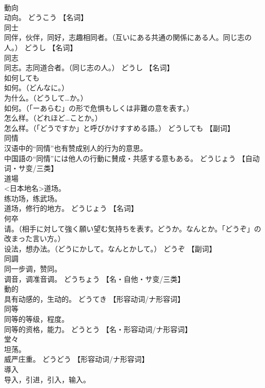 \documentclass[8pt]{extreport}
\begin{document}
\begin{CJK}{UTF8}{min}
\\	動向	
\\	动向。	どうこう		【名词】
\\	同士	
\\	同伴，伙伴，同好，志趣相同者。（互いにある共通の関係にある人。同じ志の人。）	どうし		【名词】
\\	同志	
\\	同志。志同道合者。（同じ志の人。）	どうし		【名词】
\\	如何しても	
\\	如何。（どんなに。） 
\\	为什么。（どうして…か。） 
\\	如何。（「ーあらむ」の形で危惧もしくは非難の意を表す。） 
\\	怎么样。（どれほど…ことか。） 
\\	怎么样。（「どうですか」と呼びかけすすめる語。）	どうしても		【副词】
\\	同情	
\\	汉语中的“同情”也有赞成别人的行为的意思。 
\\	中国語の“同情”には他人の行動に賛成・共感する意もある。	どうじょう		【自动词・サ变/三类】
\\	道場	
\\	<日本地名>道场。 
\\	练功场，练武场。 
\\	道场，修行的地方。	どうじょう		【名词】
\\	何卒	
\\	请。（相手に対して強く願い望む気持ちを表す。どうか。なんとか。「どうぞ」の改まった言い方。） 
\\	设法，想办法。（どうにかして。なんとかして。）	どうぞ		【副词】
\\	同調	
\\	同一步调，赞同。 
\\	调音，调准音调。	どうちょう		【名・自他・サ变/三类】
\\	動的	
\\	具有动感的，生动的。	どうてき		【形容动词/ナ形容词】
\\	同等	
\\	同等的等级，程度。 
\\	同等的资格，能力。	どうとう		【名・形容动词/ナ形容词】
\\	堂々	
\\	坦荡。 
\\	威严庄重。	どうどう		【形容动词/ナ形容词】
\\	導入	
\\	导入，引进，引入，输入。 

\end{CJK}
\end{document}
